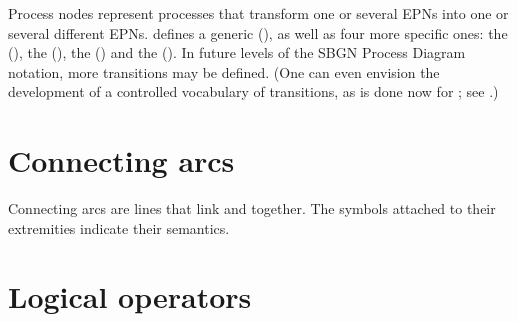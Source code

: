 Process nodes represent processes that transform one or several EPNs into one or several different EPNs.   \SBGNPDLone defines a generic  (), as well as four more specific ones: the  (), the  (), the  () and the  ().  In future levels of the SBGN Process Diagram notation, more transitions may be defined.  (One can even envision the development of a controlled vocabulary of transitions, as is done now for ; see .)

%
%
%
%
%



\section{Connecting arcs}\label{sec:arcs}

Connecting arcs are lines that link  and  together.  The symbols attached to their extremities indicate their semantics.

%
%
%
%
%
%
%
%
%



\section{Logical operators}\label{sec:logic}

%
%
%
